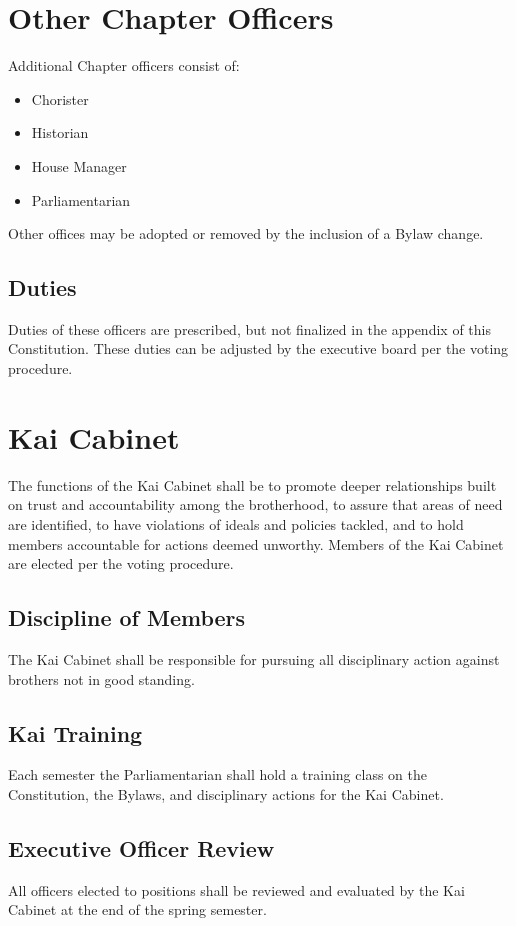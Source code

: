 \section{Other Chapter Officers}
\label{sec:other-chapter-officers}

Additional Chapter officers consist of:

\begin{itemize}
	\item Chorister
	\item Historian
	\item House Manager
	\item Parliamentarian
\end{itemize}

Other offices may be adopted or removed by the inclusion of a Bylaw change.

\subsection{Duties}
\label{sec:duties}

Duties of these officers are prescribed, but not finalized in the appendix of
this Constitution.
These duties can be adjusted by the executive board per the voting procedure.

\section{Kai Cabinet}
\label{sec:kai-cabinet}

The functions of the Kai Cabinet shall be to promote deeper relationships built
on trust and accountability among the brotherhood, to assure that areas of need
are identified, to have violations of ideals and policies tackled, and to hold
members accountable for actions deemed unworthy.
Members of the Kai Cabinet are elected per the voting procedure.

\subsection{Discipline of Members}
\label{sec:discipline-of-members}

The Kai Cabinet shall be responsible for pursuing all disciplinary action
against brothers not in good standing.

\subsection{Kai Training}
\label{sec:kai-training}

Each semester the Parliamentarian shall hold a training class on the
Constitution, the Bylaws, and disciplinary actions for the Kai Cabinet.

\subsection{Executive Officer Review}
\label{sec:executive-officer-review}

All officers elected to positions shall be reviewed and evaluated by the Kai
Cabinet at the end of the spring semester.
